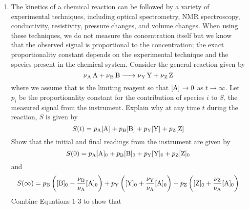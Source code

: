 \documentclass[../psets.tex]{subfiles}
\begin{document}
\begin{enumerate}[label={\textbf{28-\arabic*.}},leftmargin=3.5em]
\begin{proof}[Answer]
\begin{align*}
        \end{align*}
        and
        \begin{align*}
            A &= \frac{\e\kB T}{h}\e[\Delta^\ddagger S^\circ/R]\\
            \Delta^\ddagger S^\circ &= R\ln\frac{Ah}{\e\kB T}\\
            \Aboxed{\Delta^\ddagger S^\circ &= \SI[per-mode=fraction,fraction-function=\tfrac]{-32.1}{\joule\per\mole\per\kelvin}}
        \end{align*}
        at \SI{420}{\kelvin}.
    \end{proof}
    \item The kinetics of a chemical reaction can be followed by a variety of experimental techniques, including optical spectrometry, NMR spectroscopy, conductivity, resistivity, pressure changes, and volume changes. When using these techniques, we do not measure the concentration itself but we know that the observed signal is proportional to the concentration; the exact proportionality constant depends on the experimental technique and the species present in the chemical system. Consider the general reaction given by
    \begin{equation*}
        \ce{\nu_{\ce{A}} A + \nu_{\ce{B}} B -> \nu_{\ce{Y}} Y + \nu_{\ce{Z}} Z}
    \end{equation*}
    where we assume that  is the limiting reagent so that $\cnc{A}\to 0$ as $t\to\infty$. Let $p_i$ be the proportionality constant for the contribution of species $i$ to $S$, the measured signal from the instrument. Explain why at any time $t$ during the reaction, $S$ is given by
    \begin{equation}
        S(t) = p_{\ce{A}}\cnc{A}+p_{\ce{B}}\cnc{B}+p_{\ce{Y}}\cnc{Y}+p_{\ce{Z}}\cnc{Z}
    \end{equation}
    Show that the initial and final readings from the instrument are given by
    \begin{equation}
        S(0) = p_{\ce{A}}\cnc[0]{A}+p_{\ce{B}}\cnc[0]{B}+p_{\ce{Y}}\cnc[0]{Y}+p_{\ce{Z}}\cnc[0]{Z}
    \end{equation}
    and
    \begin{equation}
        S(\infty) = p_{\ce{B}}\left( \cnc[0]{B}-\frac{\nu_{\ce{B}}}{\nu_{\ce{A}}}\cnc[0]{A} \right)+p_{\ce{Y}}\left( \cnc[0]{Y}+\frac{\nu_{\ce{Y}}}{\nu_{\ce{A}}}\cnc[0]{A} \right)+p_{\ce{Z}}\left( \cnc[0]{Z}+\frac{\nu_{\ce{Z}}}{\nu_{\ce{A}}}\cnc[0]{A} \right)
    \end{equation}
    Combine Equations 1-3 to show that

\end{enumerate}
\end{document}
